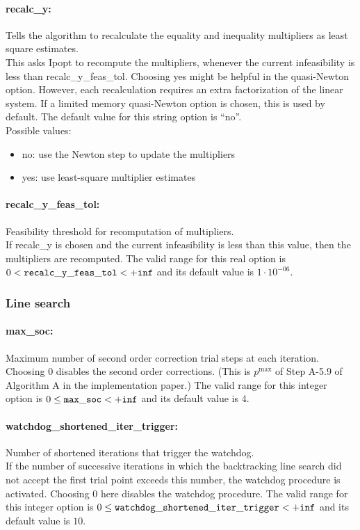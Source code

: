 \paragraph{recalc\_y:} Tells the algorithm to recalculate the equality and inequality multipliers as least square estimates. $\;$ \\
 This asks Ipopt to recompute the
multipliers, whenever the current infeasibility
is less than recalc\_y\_feas\_tol. Choosing yes
might be helpful in the quasi-Newton option. 
However, each recalculation requires an extra
factorization of the linear system.  If a limited
memory quasi-Newton option is chosen, this is
used by default.
The default value for this string option is ``no''.
\\ 
Possible values:
\begin{itemize}
   \item no: use the Newton step to update the multipliers
   \item yes: use least-square multiplier estimates
\end{itemize}

\paragraph{recalc\_y\_feas\_tol:} Feasibility threshold for recomputation of multipliers. $\;$ \\
 If recalc\_y is chosen and the current
infeasibility is less than this value, then the
multipliers are recomputed. The valid range for this real option is 
$0 <  {\tt recalc\_y\_feas\_tol } <  {\tt +inf}$
and its default value is $1 \cdot 10^{-06}$.

\subsubsection{Line search}

\paragraph{max\_soc:} Maximum number of second order correction trial steps at each iteration. $\;$ \\
 Choosing 0 disables the second order corrections.
(This is $p^{\max}$ of Step A-5.9 of Algorithm A in
the implementation paper.) The valid range for this integer option is
$0 \le {\tt max\_soc } <  {\tt +inf}$
and its default value is $4$.


\paragraph{watchdog\_shortened\_iter\_trigger:} Number of shortened iterations that trigger the watchdog. $\;$ \\
 If the number of successive iterations in which
the backtracking line search did not accept the
first trial point exceeds this number, the
watchdog procedure is activated.  Choosing 0
here disables the watchdog procedure. The valid range for this integer option is
$0 \le {\tt watchdog\_shortened\_iter\_trigger } <  {\tt +inf}$
and its default value is $10$.


